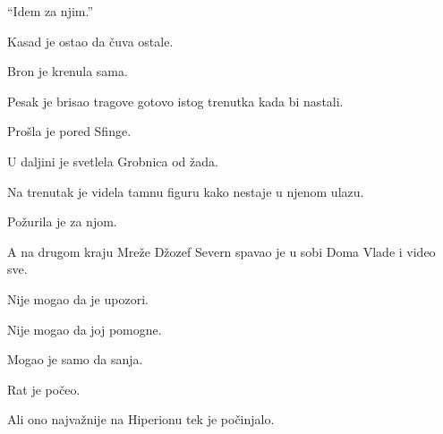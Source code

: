 ``Idem za njim.''

Kasad je ostao da čuva ostale.

Bron je krenula sama.

Pesak je brisao tragove gotovo istog trenutka kada bi nastali.

Prošla je pored Sfinge.

U daljini je svetlela Grobnica od žada.

Na trenutak je videla tamnu figuru kako nestaje u njenom ulazu.

Požurila je za njom.

A na drugom kraju Mreže Džozef Severn spavao je u sobi Doma Vlade i video sve.

Nije mogao da je upozori.

Nije mogao da joj pomogne.

Mogao je samo da sanja.

Rat je počeo.

Ali ono najvažnije na Hiperionu tek je počinjalo.